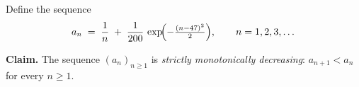 \begin{problem}
Define the sequence
\[
  a_{n} \;=\; \frac{1}{n} \;+\; \frac{1}{200}\,
  \exp\!\Bigl(-\tfrac{(n - 47)^{2}}{2}\Bigr),
  \qquad n = 1, 2, 3, \dots
\]

\textbf{Claim.} The sequence $(a_{n})_{n \geq 1}$ is \emph{strictly
monotonically decreasing}: $a_{n+1} < a_{n}$ for every $n \geq 1$.
\end{problem}
